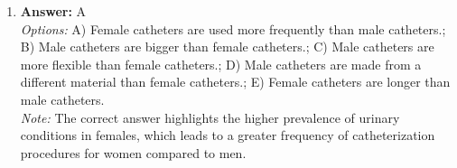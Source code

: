 \documentclass[12pt]{article}
\begin{document}
\begin{enumerate}[label=\arabic*.]
\\ \textit{Note:} Severe acute malnutrition in young children is characterized by a weight-for-age Z score of less than -2, indicating significant underweight, coupled with the presence of oedema, which reflects severe nutritional deficiency and indicates a critical health condition requiring immediate intervention.
\item \textbf{Answer:} A
\\ \textit{Options:} A) Female catheters are used more frequently than male catheters.; B) Male catheters are bigger than female catheters.; C) Male catheters are more flexible than female catheters.; D) Male catheters are made from a different material than female catheters.; E) Female catheters are longer than male catheters.
\\ \textit{Note:} The correct answer highlights the higher prevalence of urinary conditions in females, which leads to a greater frequency of catheterization procedures for women compared to men.
\end{enumerate}
\end{document}
